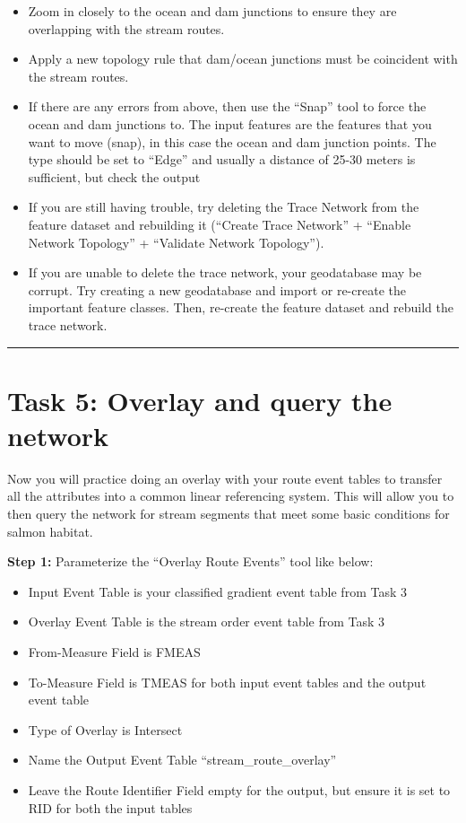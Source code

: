 \documentclass[
]{book}
\begin{document}
\begin{itemize}
\item
  Zoom in closely to the ocean and dam junctions to ensure they are overlapping with the stream routes.
\item
  Apply a new topology rule that dam/ocean junctions must be coincident with the stream routes.
\item
  If there are any errors from above, then use the ``Snap'' tool to force the ocean and dam junctions to. The input features are the features that you want to move (snap), in this case the ocean and dam junction points. The type should be set to ``Edge'' and usually a distance of 25-30 meters is sufficient, but check the output
\item
  If you are still having trouble, try deleting the Trace Network from the feature dataset and rebuilding it (``Create Trace Network'' + ``Enable Network Topology'' + ``Validate Network Topology'').
\item
  If you are unable to delete the trace network, your geodatabase may be corrupt. Try creating a new geodatabase and import or re-create the important feature classes. Then, re-create the feature dataset and rebuild the trace network.
\end{itemize}

\begin{center}\rule{0.5\linewidth}{0.5pt}\end{center}

\hypertarget{task-5-overlay-and-query-the-network}{%
\section*{Task 5: Overlay and query the network}\label{task-5-overlay-and-query-the-network}}

Now you will practice doing an overlay with your route event tables to transfer all the attributes into a common linear referencing system. This will allow you to then query the network for stream segments that meet some basic conditions for salmon habitat.

\textbf{Step 1:} Parameterize the ``Overlay Route Events'' tool like below:

\begin{itemize}
\item
  Input Event Table is your classified gradient event table from Task 3
\item
  Overlay Event Table is the stream order event table from Task 3
\item
  From-Measure Field is FMEAS
\item
  To-Measure Field is TMEAS for both input event tables and the output event table
\item
  Type of Overlay is Intersect
\item
  Name the Output Event Table ``stream\_route\_overlay''
\item
  Leave the Route Identifier Field empty for the output, but ensure it is set to RID for both the input tables
\end{itemize}
\end{document}
